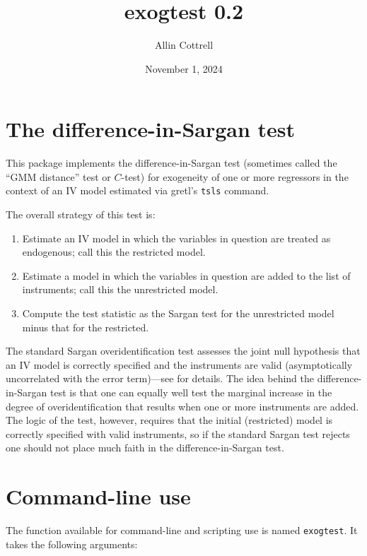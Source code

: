 \documentclass{article}
\begin{document}
\setlength{\parindent}{0pt}
\setlength{\parskip}{1ex}

\title{exogtest 0.2}
\author{Allin Cottrell}
\date{November 1, 2024}
\maketitle

\section{The difference-in-Sargan test}

This package implements the difference-in-Sargan test (sometimes
called the ``GMM distance'' test or $C$-test) for exogeneity of one or
more regressors in the context of an IV model estimated via gretl's
\texttt{tsls} command.

The overall strategy of this test is:
\begin{enumerate}
\item Estimate an IV model in which the variables in question are
  treated as endogenous; call this the restricted model.
\item Estimate a model in which the variables in question are added to
  the list of instruments; call this the unrestricted model.
\item Compute the test statistic as the Sargan test for the
  unrestricted model minus that for the restricted.
\end{enumerate}

The standard Sargan overidentification test assesses the joint null
hypothesis that an IV model is correctly specified and the instruments
are valid (asymptotically uncorrelated with the error term)---see
\citet[][section 7.8]{davidson-mackinnon93} for details. The idea
behind the difference-in-Sargan test is that one can equally well test
the marginal increase in the degree of overidentification that results
when one or more instruments are added. The logic of the test,
however, requires that the initial (restricted) model is correctly
specified with valid instruments, so if the standard Sargan test
rejects one should not place much faith in the difference-in-Sargan
test.

\section{Command-line use}

The function available for command-line and scripting use is named
\texttt{exogtest}. It takes the following arguments:
\end{document}
